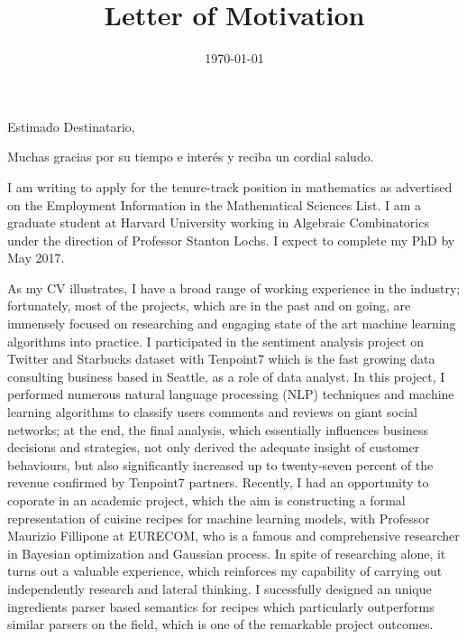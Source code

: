 \documentclass[11pt,a4paper,roman]{moderncv}        %
\title{Letter of Motivation}                               %
\begin{document}
\date{\today}
\opening{Estimado Destinatario,}
\closing{Muchas gracias por su tiempo e interés y reciba un cordial saludo.}
\makelettertitle

I am writing to apply for the tenure-track position in mathematics as advertised on the Employment Information in the Mathematical Sciences List. I am a graduate student at Harvard University working in Algebraic Combinatorics under the direction of Professor Stanton Lochs. I expect to complete my PhD by May 2017.

As my CV illustrates, I have a broad range of working experience in the industry; fortunately, most of the projects, which are in the past and on going, are immensely focused on researching and engaging state of the art machine learning algorithms into practice. I participated in the sentiment analysis project on Twitter and Starbucks dataset with Tenpoint7 which is the fast growing data consulting business based in Seattle, as a role of data analyst. In this project, I performed numerous natural language processing (NLP) techniques and machine learning algorithms to classify  users comments and reviews on giant social networks; at the end, the final analysis, which essentially influences business decisions and strategies, not only derived the adequate insight of customer behaviours, but also significantly increased up to twenty-seven percent of the revenue confirmed by Tenpoint7 partners. Recently, I had an opportunity to coporate in an academic project, which the aim is constructing a formal representation of cuisine recipes for machine learning models, with Professor Maurizio Fillipone at EURECOM, who is a famous and comprehensive researcher in Bayesian optimization and Gaussian process. In spite of researching alone, it turns out a valuable experience, which reinforces my capability of carrying out independently research and lateral thinking. I sucessfully designed an unique ingredients parser based semantics for recipes which particularly outperforms similar parsers on the field, which is one of the remarkable project outcomes.


\vspace{0.5cm}


\makeletterclosing
\end{document}
